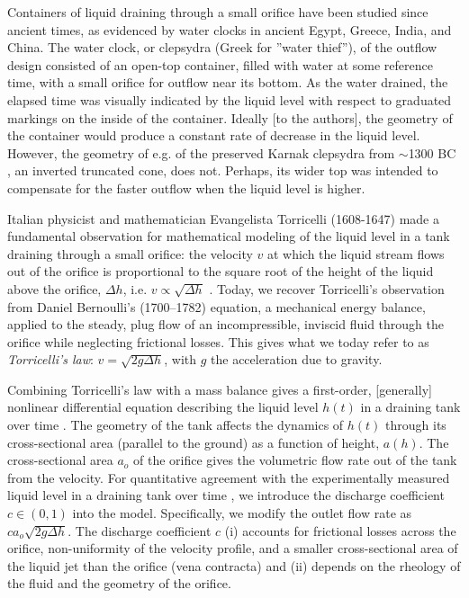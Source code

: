 \documentclass[openacc]{rsproca_new}%
\begin{document}
Containers of liquid draining through a small orifice have been studied since ancient times, as evidenced by water clocks in ancient Egypt, Greece, India, and China.
The water clock, or clepsydra (Greek for ''water thief''), of the outflow design consisted of an open-top container, filled with water at some reference time, with a small orifice for outflow near its bottom.
As the water drained, the elapsed time was visually indicated by the liquid level with respect to graduated markings on the inside of the container. \cite{bedini1962compartmented,hwang2021historical,ritner2016oriental,hejun1987research,schomberg2018karnak,mills1982newton}
Ideally [to the authors], the geometry of the container would produce a constant rate of decrease in the liquid level. However, the geometry of e.g. of the preserved Karnak clepsydra from $\sim$1300 BC \cite{schomberg2018karnak}, an inverted truncated cone, does not. Perhaps, its wider top was intended to compensate for the faster outflow when the liquid level is higher.

Italian physicist and mathematician Evangelista Torricelli (1608-1647) made a fundamental observation for mathematical modeling of the liquid level in a tank draining through a small orifice: the velocity $v$ at which the liquid stream flows out of the orifice is proportional to the square root of the height of the liquid above the orifice, $\Delta h$, i.e. $v\propto \sqrt{\Delta h}$ \cite{mills1982newton}. Today, we recover Torricelli's observation from Daniel Bernoulli's (1700–1782) equation, a mechanical energy balance, applied to the steady, plug flow of an incompressible, inviscid fluid through the orifice while neglecting frictional losses. This gives what we today refer to as \emph{Torricelli's law}: $v=\sqrt{2 g \Delta h}$, with $g$ the acceleration due to gravity. \cite{d2021torricelli}

Combining Torricelli's law with a mass balance gives a first-order, [generally] nonlinear differential equation describing the liquid level $h(t)$ in a draining tank over time \cite{groetsch1993inverse,seborg2016process}.
The geometry of the tank affects the dynamics of $h(t)$ through its cross-sectional area (parallel to the ground) as a function of height, $a(h)$.
The cross-sectional area $a_o$ of the orifice gives the volumetric flow rate out of the tank from the velocity.
For quantitative agreement with the experimentally measured liquid level in a draining tank over time \cite{de2000pin,blasone2015discharge,wadhwa2021study,liu2008drainage}, we introduce the discharge coefficient $c\in (0, 1)$ into the model. 
Specifically, we modify the outlet flow rate as $c a_o \sqrt{2 g \Delta h}$. 
The discharge coefficient $c$ (i) accounts for frictional losses across the orifice, non-uniformity of the velocity profile, and a smaller cross-sectional area of the liquid jet than the orifice (vena contracta) and (ii) depends on the rheology of the fluid and the geometry of the orifice. \cite{teoman2022discharge,hicks2014determining,blasone2015discharge}
\end{document}
